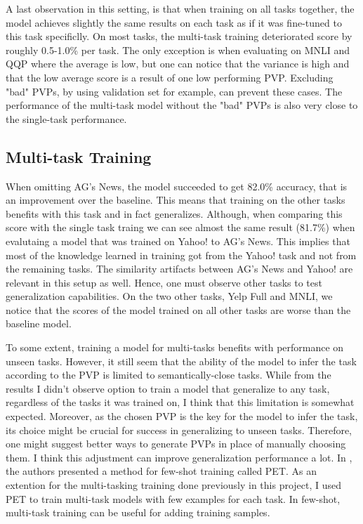\documentclass[11pt,a4paper]{article}
\begin{document}
A last observation in this setting, is that when training on all tasks together, the model achieves slightly the same results on each task as if it was fine-tuned to this task specificlly.
On most tasks, the multi-task training deteriorated score by roughly 0.5-1.0\% per task.
The only exception is when evaluating on MNLI and QQP where the average is low, but one can notice that the variance is high and that the low average score is a result of one low performing PVP.
Excluding "bad" PVPs, by using validation set for example, can prevent these cases.
The performance of the multi-task model without the "bad" PVPs is also very close to the single-task performance.

\vspace{8pt}
\subsection*{Multi-task Training}

When omitting AG's News, the model succeeded to get 82.0\% accuracy, that is an improvement over the baseline.
This means that training on the other tasks benefits with this task and in fact generalizes.
Although, when comparing this score with the single task traing we can see almost the same result (81.7\%) when evalutaing a model that was trained on Yahoo! to AG's News.
This implies that most of the knowledge learned in training got from the Yahoo! task and not from the remaining tasks.
The similarity artifacts between AG's News and Yahoo! are relevant in this setup as well.
Hence, one must observe other tasks to test generalization capabilities.
On the two other tasks, Yelp Full and MNLI, we notice that the scores of the model trained on all other tasks are worse than the baseline model.

To some extent, training a model for multi-tasks benefits with performance on unseen tasks.
However, it still seem that the ability of the model to infer the task according to the PVP is limited to semantically-close tasks.
While from the results I didn't observe option to train a model that generalize to any task, regardless of the tasks it was trained on, I think that this limitation is somewhat expected.
Moreover, as the chosen PVP is the key for the model to infer the task, its choice might be crucial for success in generalizing to unseen tasks.
Therefore, one might suggest better ways to generate PVPs in place of manually choosing them.
I think this adjustment can improve generalization performance a lot.
In \citet{schick2020exploiting}, the authors presented a method for few-shot training called PET.
As an extention for the multi-tasking training done previously in this project, I used PET to train multi-task models with few examples for each task.
In few-shot, multi-task training can be useful for adding training samples.
\end{document}
